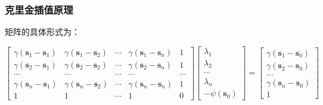 \documentclass{beamer}
\begin{document}
\begin{frame}
    \frametitle{克里金插值原理}
    矩阵的具体形式为：
    \begin{small}
        \begin{equation}
            \left[\begin{array}{ccccc}
                    \gamma \left( \mathbf{s}_{1} - \mathbf{s}_{1} \right) & \gamma \left( \mathbf{s}_{1} - \mathbf{s}_{2} \right) & \cdots & \gamma \left( \mathbf{s}_{1} - \mathbf{s}_{n} \right) & 1      \\
                    \gamma \left( \mathbf{s}_{2} - \mathbf{s}_{1} \right) & \gamma \left( \mathbf{s}_{2} - \mathbf{s}_{2} \right) & \cdots & \gamma \left( \mathbf{s}_{2} - \mathbf{s}_{n} \right) & 1      \\
                    \cdots                                                & \cdots                                                & \cdots & \cdots                                                & \cdots \\
                    \gamma \left( \mathbf{s}_{n} - \mathbf{s}_{1} \right) & \gamma \left( \mathbf{s}_{n} - \mathbf{s}_{2} \right) & \cdots & \gamma \left( \mathbf{s}_{n} - \mathbf{s}_{n} \right) & 1      \\
                    1                                                     & 1                                                     & \cdots & 1                                                     & 0
                \end{array}\right]\left[\begin{array}{c}
                    \lambda_{1} \\
                    \lambda_{2} \\
                    \cdots      \\
                    \lambda_{n} \\
                    -\psi\left( \mathbf{s}_{0} \right)
                \end{array}\right]=\left[\begin{array}{c}
                    \gamma \left( \mathbf{s}_{1} - \mathbf{s}_{0} \right) \\
                    \gamma \left( \mathbf{s}_{2} - \mathbf{s}_{0} \right) \\
                    \ldots                                                \\
                    \gamma \left( \mathbf{s}_{n} - \mathbf{s}_{0} \right) \\
                    1
                \end{array}\right]
        \end{equation}
    \end{small}
\end{frame}
\end{document}
